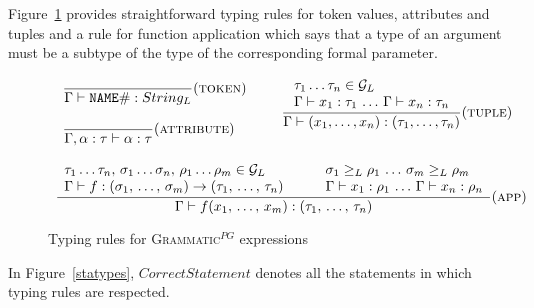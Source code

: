 \documentclass{llncs2e/llncs}
\newcommand{\trule}[3]{%
\dfrac{#1}{#2}(\mbox{\textsc{#3}})
}
\newcommand{\figref}[1]{Figure~\ref{#1}}
\newcommand{\ATF}{\textsc{Grammatic}$^{PG}$}
\begin{document}
\figref{exptypes} provides straightforward typing rules for token values, attributes and tuples and a rule for function application which says that a type of an argument must be a subtype of the type of the corresponding formal parameter.

\begin{figure}[htbp]
$$\begin{array}{lll}

	\begin{array}{l}
		\trule{}{\Gamma \vdash \mathtt{NAME\#} : \Str}{token}\\
		\\
		\trule{}{\Gamma, \alpha : \tau \vdash \alpha : \tau }{attribute}\\
	\end{array}
&&
\trule{
\begin{array}{l}
	\tau_1 \ldots\tau_n \in \G\\
	\Gamma \vdash x_1 : \tau_1 \, \ldots \, \Gamma \vdash x_n : \tau_n
\end{array}
}{
	\Gamma \vdash (x_1, \ldots, x_n) : (\tau_1, \ldots, \tau_n)
}{tuple}

\\
&&\hspace{10pt}\\
\multicolumn{3}{c}{
\trule{	
\begin{array}{lll}
		\tau_1 \ldots\tau_n,\, \sigma_1 \ldots \sigma_n,\, \rho_1 \ldots \rho_m \in \G
		&\quad&
		\sigma_1 \gel \rho_1\,\ldots\, \sigma_m \gel \rho_m\\
		\Gamma \vdash f : (\sigma_1,\,\ldots,\,\sigma_m) \rightarrow (\tau_1,\,\ldots,\,\tau_n)
		&\quad&
		\Gamma \vdash x_1 : \rho_1 \, \ldots \, \Gamma \vdash x_n : \rho_n\\
\end{array}
}{\Gamma \vdash f(x_1,\,\ldots,\,x_m) : (\tau_1,\,\ldots,\,\tau_n)}{app}
}
\end{array}$$
\caption{Typing rules for \ATF{} expressions}\label{exptypes}
\end{figure}

In \figref{statypes}, $CorrectStatement$ denotes all the statements in which typing rules are respected. 
\end{document}
